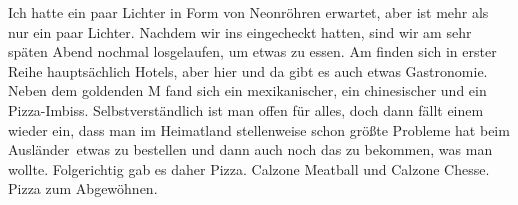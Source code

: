 Ich hatte ein paar Lichter in Form von Neonröhren erwartet, aber  ist mehr als nur ein paar Lichter.
Nachdem wir ins  eingecheckt hatten, sind wir am sehr späten Abend nochmal losgelaufen, um etwas zu essen.
Am  finden sich in erster Reihe hauptsächlich Hotels, aber hier und da gibt es auch etwas Gastronomie.
Neben dem goldenden M fand sich ein mexikanischer, ein chinesischer und ein Pizza-Imbiss.
Selbstverständlich ist man offen für alles, doch dann fällt einem wieder ein, dass man im Heimatland stellenweise schon größte Probleme hat beim \glqq Ausländer\grqq \, etwas zu bestellen und dann auch noch das zu bekommen, was man wollte.
Folgerichtig gab es daher Pizza.
Calzone Meatball und Calzone Chesse.
Pizza zum Abgewöhnen.

